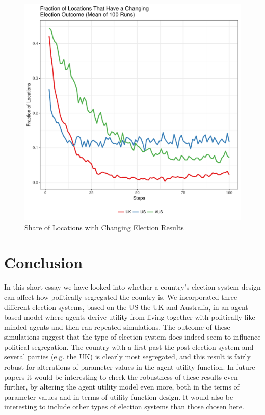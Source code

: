 \documentclass[12pt, a4paper]{article}
\begin{document}
	\begin{figure}[bp!]
		\centering
		\caption{Share of Locations with Changing Election Results}
		\includegraphics[scale=0.6]{./Plots/election_plot.pdf}
	\end{figure}
	
	\section{\label{sec_conc}Conclusion}
	In this short essay we have looked into whether a country's election system design can affect how politically segregated the country is. We incorporated three different election systems, based on the US the UK and Australia, in an agent-based model where agents derive utility from living together with politically like-minded agents and then ran repeated simulations. The outcome of these simulations suggest that the type of election system does indeed seem to influence political segregation. The country with a first-past-the-post election system and several parties (e.g. the UK) is clearly most segregated, and this result is fairly robust for alterations of parameter values in the agent utility function. 
	\newline In future papers it would be interesting to check the robustness of these results even further, by altering the agent utility model even more, both in the terms of parameter values and in terms of utility function design. It would also be interesting to include other types of election systems than those chosen here.  
	
\end{document}
